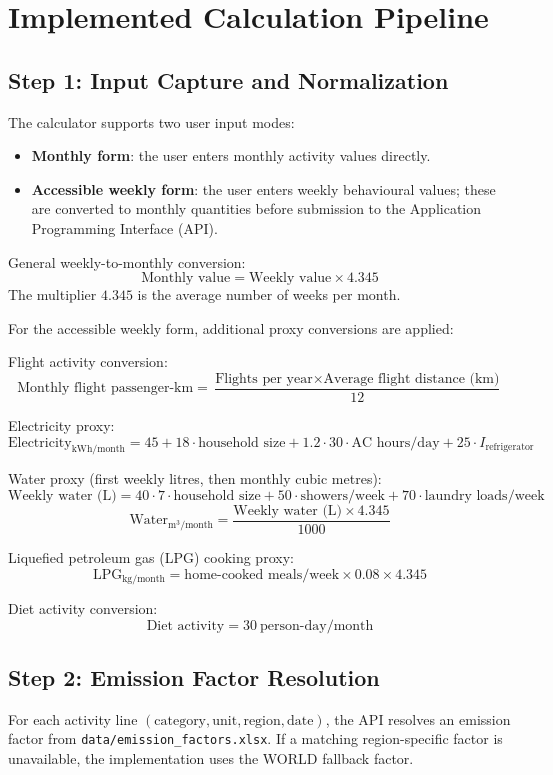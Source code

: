 \documentclass[11pt,a4paper]{article}
\begin{document}
\section{Implemented Calculation Pipeline}
\subsection{Step 1: Input Capture and Normalization}
The calculator supports two user input modes:
\begin{itemize}
  \item \textbf{Monthly form}: the user enters monthly activity values directly.
  \item \textbf{Accessible weekly form}: the user enters weekly behavioural values; these are converted to monthly quantities before submission to the Application Programming Interface (API).
\end{itemize}

General weekly-to-monthly conversion:
$$
\text{Monthly value} = \text{Weekly value} \times 4.345
$$
The multiplier \(4.345\) is the average number of weeks per month.

For the accessible weekly form, additional proxy conversions are applied:

Flight activity conversion:
$$
\text{Monthly flight passenger-km} =
\frac{\text{Flights per year} \times \text{Average flight distance (km)}}{12}
$$

Electricity proxy:
$$
\text{Electricity}_{\text{kWh/month}} =
45 + 18 \cdot \text{household size} + 1.2 \cdot 30 \cdot \text{AC hours/day} + 25 \cdot I_{\text{refrigerator}}
$$

Water proxy (first weekly litres, then monthly cubic metres):
$$
\text{Weekly water (L)} =
40 \cdot 7 \cdot \text{household size} + 50 \cdot \text{showers/week} + 70 \cdot \text{laundry loads/week}
$$
$$
\text{Water}_{\text{m}^3/\text{month}} =
\frac{\text{Weekly water (L)} \times 4.345}{1000}
$$

Liquefied petroleum gas (LPG) cooking proxy:
$$
\text{LPG}_{\text{kg/month}} =
\text{home-cooked meals/week} \times 0.08 \times 4.345
$$

Diet activity conversion:
$$
\text{Diet activity} = 30\ \text{person-day/month}
$$

\subsection{Step 2: Emission Factor Resolution}
For each activity line \((\text{category}, \text{unit}, \text{region}, \text{date})\), the API resolves an emission factor from \texttt{data/emission\_factors.xlsx}. If a matching region-specific factor is unavailable, the implementation uses the WORLD fallback factor.
\end{document}
